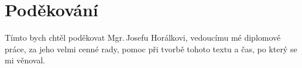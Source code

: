 

\section*{Poděkování}
Tímto bych chtěl poděkovat Mgr.\,Josefu Horálkovi, vedoucímu mé diplomové práce, za jeho velmi cenné rady, pomoc při tvorbě tohoto textu a čas, po který se mi věnoval.

\newpage